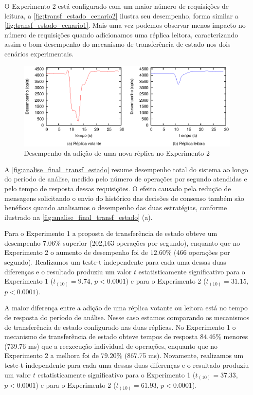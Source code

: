 O Experimento 2 está configurado com um maior número de requisições de leitura, a
\autoref{fig:transf_estado_cenario2} ilustra seu desempenho, forma similar a
\autoref{fig:transf_estado_cenario1}. Mais uma vez podemos observar menos impacto no
número de requisições quando adicionamos uma réplica leitora, caracterizando assim o bom
desempenho do mecanismo de transferência de estado nos dois cenários experimentais.

\begin{figure}[ht]
  \centering
  \includegraphics[width=14cm]{conteudo/capitulos/figuras/final-transf-estado-pr80.eps}
  \caption{Desempenho da adição de uma nova réplica no Experimento 2}
  \label{fig:transf_estado_cenario2}
\end{figure}

A \autoref{fig:analise_final_transf_estado} resume desempenho total do sistema ao longo do
período de análise, medido pelo número de operações por segundo atendidas e pelo tempo de
resposta dessas requisições. O efeito causado pela redução de mensagens solicitando o
envio do histórico das decisões de consenso também são benéficos quando analisamos o
desempenho das duas estratégias, conforme ilustrado na
\autoref{fig:analise_final_transf_estado} (a).

Para o Experimento 1 a proposta de transferência de estado obteve um desempenho $7.06\%$
superior (202,163 operações por segundo), enquanto que no Experimento 2 o aumento de
desempenho foi de $12.60\%$ (466 operações por segundo). Realizamos um teste-t
independente para cada uma dessas duas diferenças e o resultado produziu um valor $t$
estatisticamente significativo para o Experimento 1 ($t_{(10)}=9.74$, $p < 0.0001$) e para
o Experimento 2 ($t_{(10)}=31.15$, $p < 0.0001$).

A maior diferença entre a adição de uma réplica votante ou leitora está no tempo de
resposta do período de análise. Nesse caso estamos comparando os mecanismos de
transferência de estado configurado nas duas réplicas. No Experimento 1 o mecanismo de
transferência de estado obteve tempos de resposta $84.46\%$ menores (739.76 ms) que a
reexecução individual de operações, enquanto que no Experimento 2 a melhora foi de
$79.20\%$ (867.75 ms). Novamente, realizamos um teste-t independente para cada uma dessas
duas diferenças e o resultado produziu um valor $t$ estatisticamente significativo para o
Experimento 1 ($t_{(10)}=37.33$, $p < 0.0001$) e para o Experimento 2 ($t_{(10)}=61.93$,
$p < 0.0001$).

